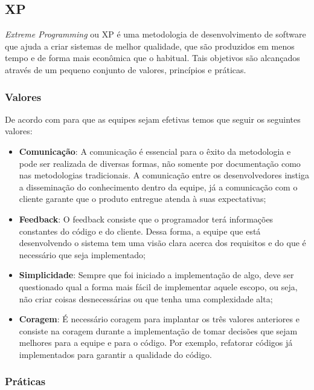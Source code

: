 \subsection{XP}

\textit{Extreme Programming} ou XP é uma metodologia de desenvolvimento de software que ajuda a criar sistemas de melhor qualidade, que são produzidos em menos tempo e de forma mais econômica que o habitual. Tais objetivos são alcançados através de um pequeno conjunto de valores, princípios e práticas. \cite{beck}

\subsubsection{Valores}

De acordo com \cite{beck} para que as equipes sejam efetivas temos que seguir os seguintes valores:

\begin{itemize}
  \item \textbf{Comunicação}: A comunicação é essencial para o êxito da metodologia e pode ser realizada de diversas formas, não somente por documentação como nas metodologias tradicionais. A comunicação entre os desenvolvedores instiga a disseminação do conhecimento dentro da equipe, já a comunicação com o cliente garante que o produto entregue atenda à suas expectativas;
  \item \textbf{Feedback}: O feedback consiste que o programador terá informações constantes do código e do cliente.  Dessa forma, a equipe que está desenvolvendo o sistema tem uma visão clara acerca dos requisitos e do que é necessário que seja implementado;
  \item \textbf{Simplicidade}: Sempre que foi iniciado a implementação de algo, deve ser questionado qual a forma mais fácil de implementar aquele escopo, ou seja, não criar coisas desnecessárias ou que tenha uma complexidade alta;
  \item \textbf{Coragem}: É necessário coragem para implantar os três valores anteriores e consiste na coragem durante a implementação de tomar decisões que sejam melhores para a equipe e para o código. Por exemplo, refatorar códigos já implementados para garantir a qualidade do código.
\end{itemize}

\subsubsection{Práticas}

